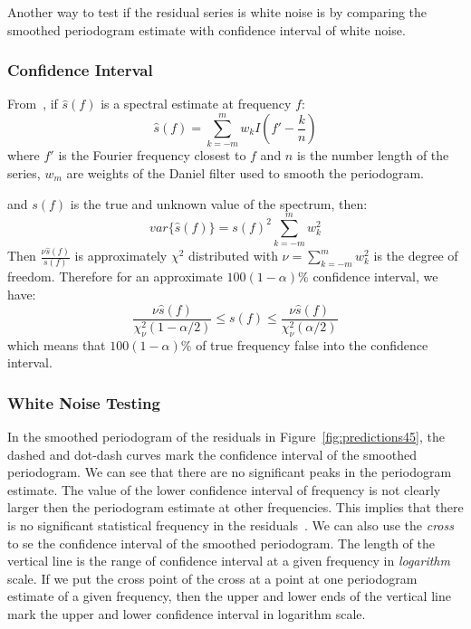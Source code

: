 \documentclass[12pt]{article}
\begin{document}
Another way to test if the residual series is white noise is by comparing the
smoothed periodogram estimate with confidence interval of white noise.

\subsubsection{Confidence Interval}
From~\cite{bloomfieldFourierTimeSeries}, if $\hat{s}(f)$ is a spectral estimate
at frequency $f$: 
\begin{equation}
\hat{s}(f)=\sum_{k=-m}^mw_kI(f'-\frac{k}{n})
\end{equation}
where $f'$ is the Fourier frequency closest to $f$ and $n$ is the number length
of the series, $w_m$ are weights of the Daniel filter used to smooth the
periodogram.

and $s(f)$ is the true and unknown value of the spectrum, then:
\begin{equation}
var\{\hat{s}(f)\}=s(f)^2\sum_{k=-m}^mw_k^2
\end{equation}
Then
$\frac{\nu \hat{s}(f)}{s(f)}$ is approximately $\chi^2$ distributed with
$\nu=\sum_{k=-m}^mw_k^2$ is the degree of freedom. Therefore for an approximate
$100(1-\alpha)\%$ confidence interval, we have:
\begin{equation}\label{eqn:confidenceInterval}
\frac{\nu\hat{s}(f)}{\chi_{\nu}^2(1-\alpha/2)}\leq s(f)\leq
\frac{\nu\hat{s}(f)}{\chi_{\nu}^2(\alpha/2)}
\end{equation}
which means that $100(1-\alpha)\%$ of true frequency false into the confidence
interval.
\subsubsection{White Noise Testing}
In the smoothed periodogram of the residuals in Figure~\ref{fig:predictions45},
the dashed and dot-dash curves mark the confidence interval of the smoothed
periodogram. We can see that there are no significant peaks in the periodogram
estimate. The value of the lower confidence interval of frequency is not clearly
larger then the periodogram estimate at other frequencies. This implies that
there is no significant statistical frequency in the
residuals~\cite{CryerTimeSeries}. We can also use the \textit{cross} to se the
confidence interval of the smoothed periodogram. The length of the vertical line
is the range of confidence interval at a given frequency in \textit{logarithm} scale. If we put the cross point of
the cross at a point at one periodogram estimate of a given frequency, then the
upper and lower ends of the vertical line mark the upper and lower confidence
interval in logarithm scale.
\end{document}
